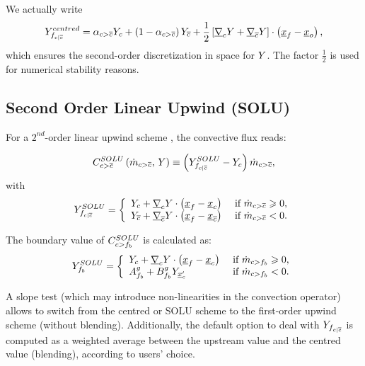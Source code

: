 \begin{remark}

We actually write
%
\begin{equation}
Y_{{f}_{c|{\overline{c}}}}^{centred} = \alpha_{{c > {\overline{c}}}} Y_{c} + \left( 1 - \alpha_{{c > {\overline{c}}}} \right) Y_{{\overline{c}}}
+
\dfrac{1}{2} \left[ \underline{\nabla}_{c} Y + \underline{\nabla}_{{\overline{c}}} Y \right] \cdot \left(\underline{x}_{{f}} - \underline{x}_o\right),
\end{equation}
%
which ensures the second-order discretization in space for $Y$.
The factor $ \frac{1}{2}$ is used for numerical stability reasons.
\end{remark}

\subsection{Second Order Linear Upwind (SOLU)}
For a $2^{nd}$-order linear upwind scheme%
, the convective flux reads:

\begin{equation}
C_{{c > {\overline{c}}}}^{SOLU} \left( \dot{m}_{{c > {\overline{c}}}} , \, Y \right)  \equiv \left(Y_{{{f}_{c|{\overline{c}}}}}^{SOLU} - Y_{c} \right) \dot{m}_{{c > {\overline{c}}}} ,
\end{equation}
with
\begin{equation}
Y_{{f}_{c|{\overline{c}}}}^{SOLU} =
\left\lbrace\begin{array}{l l}
Y_{c} +\underline{\nabla}_{c} Y \cdot \left(\underline{x}_{{f}} - {\underline{x}_{c}}\right)  & \text{ if } \dot{m}_{{c > {\overline{c}}}}  \geqslant 0,\\
Y_{{\overline{c}}} +\underline{\nabla}_{{\overline{c}}} Y \cdot \left(\underline{x}_{{f}} - \underline{x}_{{\overline{c}}}\right)   & \text{ if } \dot{m}_{{c > {\overline{c}}}} < 0 .
\end{array}\right.
\end{equation}


The boundary value of $C_{c>{{f}_{b}}}^{SOLU}$ is calculated as:
\begin{equation}
Y_{{f}_{b}}^{SOLU} =
\left\lbrace\begin{array}{l l}
Y_{c} +\underline{\nabla}_{c} Y \cdot \left(\underline{x}_{{f}} - {\underline{x}_{c}}\right)  & \text{ if } \dot{m}_{{c>{{f}_{b}}}}  \geqslant 0,\\
A^g_{{{f}_{b}}}  + B^g_{{{f}_{b}}} Y_{\underline{x}_{c}^\prime}  & \text{ if } \dot{m}_{{c>{{f}_{b}}}} < 0.
\end{array}\right.
\end{equation}

\begin{remark}
A slope test (which may introduce non-linearities in the convection operator) allows to switch from
the centred or SOLU scheme to the first-order upwind scheme (without blending). Additionally, the default option to deal with $Y_{{f}_{c|{\overline{c}}}}$ is
computed as a weighted average between the upstream value and the centred value (blending), according to users' choice.
\end{remark}


